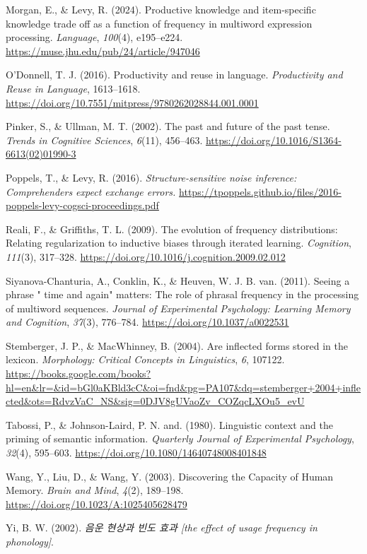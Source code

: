 \documentclass[
  12pt,
]{scrartcl}
\newlength{\cslhangindent}
\newenvironment{CSLReferences}[2] %
 {\begin{list}{}{%
  \setlength{\itemindent}{0pt}
  \setlength{\leftmargin}{0pt}
  \setlength{\parsep}{0pt}
  \ifodd #1
   \setlength{\leftmargin}{\cslhangindent}
   \setlength{\itemindent}{-1\cslhangindent}
  \fi
  \setlength{\itemsep}{#2\baselineskip}}}
 {\end{list}}
\begin{document}
\begin{CSLReferences}{1}{0}
Morgan, E., \& Levy, R. (2024). Productive knowledge and item-specific
knowledge trade off as a function of frequency in multiword expression
processing. \emph{Language}, \emph{100}(4), e195--e224.
\url{https://muse.jhu.edu/pub/24/article/947046}

O'Donnell, T. J. (2016). Productivity and reuse in language.
\emph{Productivity and Reuse in Language}, 1613--1618.
\url{https://doi.org/10.7551/mitpress/9780262028844.001.0001}

Pinker, S., \& Ullman, M. T. (2002). The past and future of the past
tense. \emph{Trends in Cognitive Sciences}, \emph{6}(11), 456--463.
\url{https://doi.org/10.1016/S1364-6613(02)01990-3}

Poppels, T., \& Levy, R. (2016). \emph{Structure-sensitive noise
inference: Comprehenders expect exchange errors.}
\url{https://tpoppels.github.io/files/2016-poppels-levy-cogsci-proceedings.pdf}

Reali, F., \& Griffiths, T. L. (2009). The evolution of frequency
distributions: Relating regularization to inductive biases through
iterated learning. \emph{Cognition}, \emph{111}(3), 317--328.
\url{https://doi.org/10.1016/j.cognition.2009.02.012}

Siyanova-Chanturia, A., Conklin, K., \& Heuven, W. J. B. van. (2011).
Seeing a phrase {"} time and again{"} matters: The role of phrasal
frequency in the processing of multiword sequences. \emph{Journal of
Experimental Psychology: Learning Memory and Cognition}, \emph{37}(3),
776--784. \url{https://doi.org/10.1037/a0022531}

Stemberger, J. P., \& MacWhinney, B. (2004). Are inflected forms stored
in the lexicon. \emph{Morphology: Critical Concepts in Linguistics},
\emph{6}, 107122.
\url{https://books.google.com/books?hl=en&lr=&id=bGl0aKBld3cC&oi=fnd&pg=PA107&dq=stemberger+2004+inflected&ots=RdvzVaC_NS&sig=0DJV8gUVaoZv_COZqcLXOu5_evU}

Tabossi, P., \& Johnson-Laird, P. N. and. (1980). Linguistic context and
the priming of semantic information. \emph{Quarterly Journal of
Experimental Psychology}, \emph{32}(4), 595--603.
\url{https://doi.org/10.1080/14640748008401848}

Wang, Y., Liu, D., \& Wang, Y. (2003). Discovering the Capacity of Human
Memory. \emph{Brain and Mind}, \emph{4}(2), 189--198.
\url{https://doi.org/10.1023/A:1025405628479}

Yi, B. W. (2002). \emph{음운 현상과 빈도 효과 {[}the effect of usage
frequency in phonology{]}}.

\end{CSLReferences}
\end{document}
